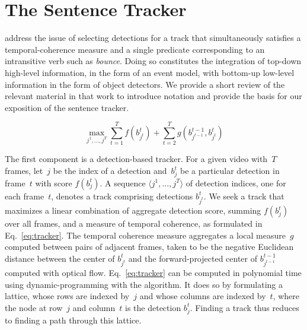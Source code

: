 \vspace*{-2ex}
\section{The Sentence Tracker}
\label{sec:tracker}
\vspace*{-2ex}

\citet{Barbu2012b} address the issue of selecting detections for a track that
simultaneously satisfies a temporal-coherence measure and a single predicate
corresponding to an intransitive verb such as \emph{bounce}.
%
Doing so constitutes the integration of top-down high-level information, in the
form of an event model, with bottom-up low-level information in the form of
object detectors.
%
We provide a short review of the relevant material in that work to introduce
notation and provide the basis for our exposition of the sentence tracker.

\begin{figure}
  \vspace*{-3.5ex}
  \begin{center}
    \begin{minipage}[b]{0.44\textwidth}
      \begin{equation}
        \max_{j^1,\ldots,j^T}
        \sum_{t=1}^Tf(b^t_{j^t})+\sum_{t=2}^Tg(b^{t-1}_{j^{t-1}},b^t_{j^t})
        \label{eq:tracker}
      \end{equation}
    \end{minipage}
  \end{center}
  \vspace*{-4ex}
\end{figure}
%
The first component is a detection-based tracker.
%
For a given video with~$T$ frames, let~$j$ be the index of a detection
and~$b^t_j$ be a particular detection in frame~$t$ with score $f(b^t_j)$.
%
A sequence $\langle j^1,\ldots,j^T\rangle$ of detection indices, one for each
frame~$t$, denotes a track comprising detections $b^t_{j^t}$.
%
We seek a track that maximizes a linear combination of aggregate detection
score, summing $f(b^t_j)$ over all frames, and a measure of temporal coherence,
as formulated in Eq.~\ref{eq:tracker}.
%
The temporal coherence measure aggregates a local measure~$g$ computed between
pairs of adjacent frames, taken to be the negative Euclidean distance between
the center of $b^t_{j^t}$ and the forward-projected center of
$b^{t-1}_{j^{t-1}}$ computed with optical flow.
%
Eq.~\ref{eq:tracker} can be computed in polynomial time using
dynamic-programming with the \citet{Viterbi1971} algorithm.
%
It does so by formulating a lattice, whose rows are indexed by~$j$ and whose
columns are indexed by~$t$, where the node at row~$j$ and column~$t$ is the
detection $b^t_j$.
%
Finding a track thus reduces to finding a path through this lattice.

